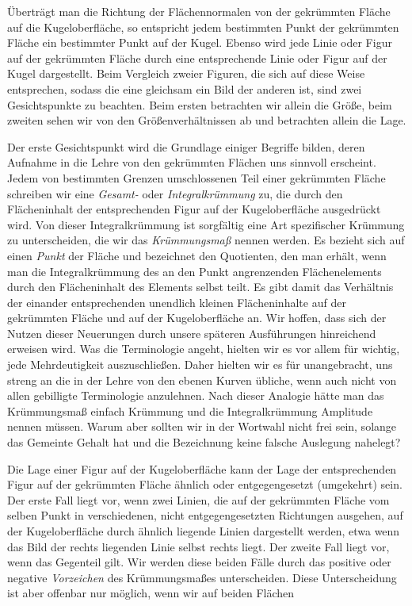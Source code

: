 %
\begingroup{}\relax
{}
\indent Überträgt man die Richtung der Flächennormalen von der gekrümmten Fläche auf die Kugeloberfläche, so entspricht jedem bestimmten Punkt der gekrümmten Fläche ein bestimmter Punkt auf der Kugel. Ebenso wird jede Linie oder Figur auf der gekrümmten Fläche durch eine entsprechende Linie oder Figur auf der Kugel dargestellt. Beim Vergleich zweier Figuren, die sich auf diese Weise entsprechen, sodass die eine gleichsam ein Bild der anderen ist, sind zwei Gesichtspunkte zu beachten. Beim ersten betrachten wir allein die Größe, beim zweiten sehen wir von den Größenverhältnissen ab und betrachten allein die Lage.

Der erste Gesichtspunkt wird die Grundlage einiger Begriffe bilden, deren Aufnahme in die Lehre von den gekrümmten Flächen uns sinnvoll erscheint. Jedem von bestimmten Grenzen umschlossenen Teil einer gekrümmten Fläche schreiben wir eine \textit{Gesamt-} oder \textit{Integralkrümmung} zu, die durch den Flächeninhalt der entsprechenden Figur auf der Kugeloberfläche ausgedrückt wird. Von dieser Integralkrümmung ist sorgfältig eine Art spezifischer Krümmung zu unterscheiden, die wir das \textit{Krümmungsmaß} nennen werden. Es bezieht sich auf einen \textit{Punkt} der Fläche und bezeichnet den Quotienten, den man erhält, wenn man die Integralkrümmung des an den Punkt angrenzenden Flächenelements durch den Flächeninhalt des Elements selbst teilt. Es gibt damit das Verhältnis der einander entsprechenden unendlich kleinen Flächeninhalte auf der gekrümmten Fläche und auf der Kugeloberfläche an. Wir hoffen, dass sich der Nutzen dieser Neuerungen durch unsere späteren Ausführungen hinreichend erweisen wird. Was die Terminologie angeht, hielten wir es vor allem für wichtig, jede Mehrdeutigkeit auszuschließen. Daher hielten wir es für unangebracht, uns streng an die in der Lehre von den ebenen Kurven übliche, wenn auch nicht von allen gebilligte Terminologie anzulehnen. Nach dieser Analogie hätte man das Krümmungsmaß einfach Krümmung und die Integralkrümmung Amplitude nennen müssen. Warum aber sollten wir in der Wortwahl nicht frei sein, solange das Gemeinte Gehalt hat und die Bezeichnung keine falsche Auslegung nahelegt?

Die Lage einer Figur auf der Kugeloberfläche kann der Lage der entsprechenden Figur auf der gekrümmten Fläche ähnlich oder entgegengesetzt (umgekehrt) sein. Der erste Fall liegt vor, wenn zwei Linien, die auf der gekrümmten Fläche vom selben Punkt in verschiedenen, nicht entgegengesetzten Richtungen ausgehen, auf der Kugeloberfläche durch ähnlich liegende Linien dargestellt werden, etwa wenn das Bild der rechts liegenden Linie selbst rechts liegt. Der zweite Fall liegt vor, wenn das Gegenteil gilt. Wir werden diese beiden Fälle durch das positive oder negative \textit{Vorzeichen} des Krümmungsmaßes unterscheiden. Diese Unterscheidung ist aber offenbar nur möglich, wenn wir auf beiden Flächen %

